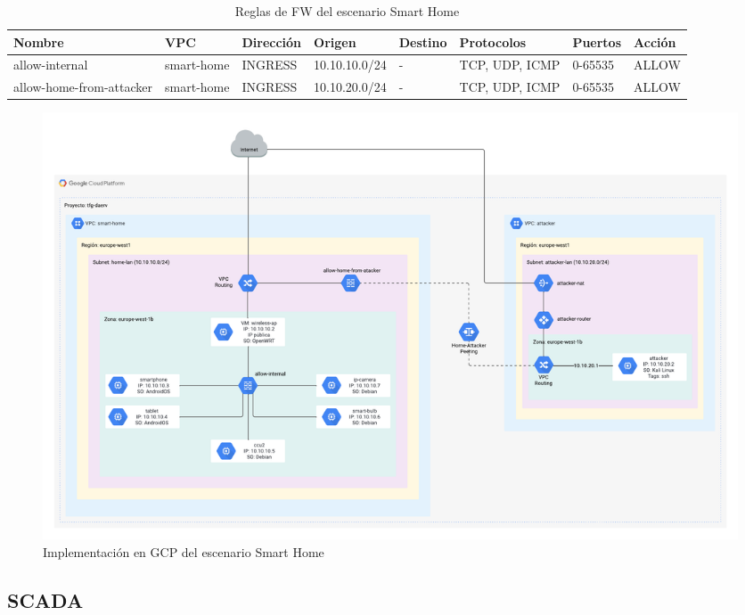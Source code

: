   \begin{table}[h]
    \begin{center}
      \footnotesize\hspace*{-1.75cm}\begin{tabular}{ | m{2cm} | m{2cm} | w{c}{1,5cm} | m{2cm} | m{2cm} | m{2cm} | w{c}{1,25cm} | w{c}{1,25cm} | }
        \hline{} \centering\textbf{Nombre} & \centering\textbf{VPC} & \textbf{Dirección} & \centering\textbf{Origen} & \centering\textbf{Destino} & \centering\textbf{Protocolos} & \textbf{Puertos} & \textbf{Acción} \\ \hline
        allow-internal & smart-home & INGRESS & 10.10.10.0/24 & \centering- & TCP, UDP, ICMP & 0-65535 & ALLOW  \\ \hline{}
        allow-home-from-attacker & smart-home & INGRESS & 10.10.20.0/24 & \centering- & TCP, UDP, ICMP & 0-65535 & ALLOW  \\ \hline
      \end{tabular}\hspace*{-1.75cm}
      \caption{Reglas de FW del escenario Smart Home}
      \label{tab:fw3}
    \end{center}
  \end{table}

  \clearpage
  \begin{figure}[h]
  \centering
  \includegraphics[width=1.45\textwidth, angle=270]{../imgs/desarrollo/escenarios-de-red/smart-home/EscenarioSmartHome.png}
  \caption{Implementación en GCP del escenario Smart Home}
  \label{fig:sh-i}
  \end{figure}
  \clearpage

\subsection{SCADA} \label{sec:sh}
